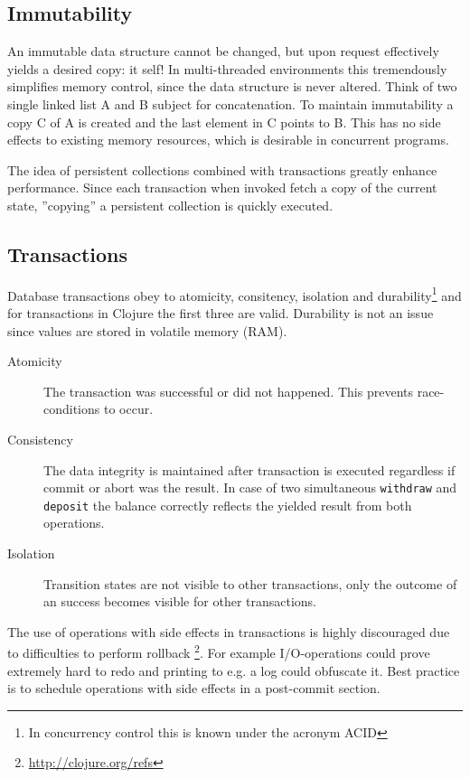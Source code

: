 \documentclass[a4paper,12pt]{kth-mag}
\begin{document}
\subsection{Immutability} \label{sec:immutability}
An immutable data structure cannot be changed, but upon request effectively yields a desired copy: it self! In multi-threaded environments this tremendously simplifies memory control, since the data structure is never altered. Think of two single linked list A and B subject for concatenation. To maintain immutability a copy C of A is created and the last element in C points to B. This has no side effects to existing memory resources, which is desirable in concurrent programs.

The idea of persistent collections combined with transactions greatly enhance performance. Since each transaction when invoked fetch a copy of the current state, ''copying'' a persistent collection is quickly executed.

\subsection{Transactions} \label{sec:transactions}
Database transactions obey to atomicity, consitency, isolation and durability\footnote{In concurrency control this is known under the acronym ACID} and for transactions in Clojure the first three are valid. Durability is not an issue since values are stored in volatile memory (RAM).

\begin{description}
    \item[Atomicity] The transaction was successful or did not happened. This prevents race-conditions to occur.
    \item[Consistency] The data integrity is maintained after transaction is executed regardless if commit or abort was the result. In case of two simultaneous \texttt{withdraw} and \texttt{deposit} the balance correctly reflects the yielded result from both operations.
    \item[Isolation] Transition states are not visible to other transactions, only the outcome of an success becomes visible for other transactions.
\end{description}

The use of operations with side effects in transactions is highly discouraged due to difficulties to perform rollback \footnote{\url{http://clojure.org/refs}}. For example I/O-operations could prove extremely hard to redo and printing to e.g. a log could obfuscate it. Best practice is to schedule operations with side effects in a post-commit section.
\end{document}
